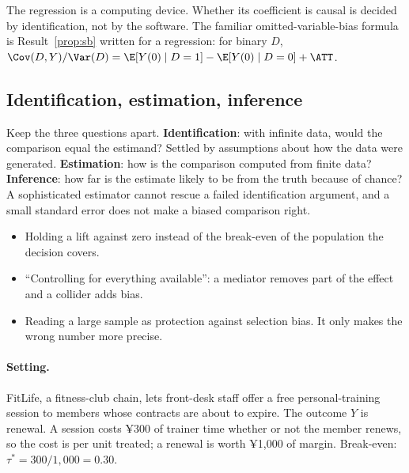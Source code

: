 \documentclass[11pt]{article}
\begin{document}
The regression is a computing device. Whether its coefficient is causal is decided by identification, not
by the software. The familiar omitted-variable-bias formula is Result~\ref{prop:sb} written for a regression: for binary
$D$, $\Cov(D,Y)/\Var(D) = \E[Y(0) \mid D=1] - \E[Y(0) \mid D=0] + \ATT$.

\subsection{Identification, estimation, inference}

Keep the three questions apart. \textbf{Identification}: with infinite data, would the comparison equal
the estimand? Settled by assumptions about how the data were generated. \textbf{Estimation}: how is the
comparison computed from finite data? \textbf{Inference}: how far is the estimate likely to be from the
truth because of chance? A sophisticated estimator cannot rescue a failed identification argument, and a
small standard error does not make a biased comparison right.

\begin{pitfall}
\begin{itemize}[leftmargin=1.2em]
  \item Holding a lift against zero instead of the break-even of the population the decision covers.
  \item ``Controlling for everything available'': a mediator removes part of the effect and a collider
  adds bias.
  \item Reading a large sample as protection against selection bias. It only makes the wrong number more
  precise.
\end{itemize}
\end{pitfall}


\sectiontwo

\paragraph{Setting.} FitLife, a fitness-club chain, lets front-desk staff offer a free personal-training
session to members whose contracts are about to expire. The outcome $Y$ is renewal. A session costs ¥300
of trainer time whether or not the member renews, so the cost is per unit treated; a renewal is worth ¥1{,}000
of margin. Break-even: $\tau^\ast = 300/1{,}000 = 0.30$.
\end{document}
